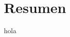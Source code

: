 \documentclass{pfc}
\subtitle{Informe final}
\begin{document}
	\frontmatter
	\maketitle
	\chapter{Resumen}
	hola

	\tableofcontents

	\mainmatter
\end{document}
